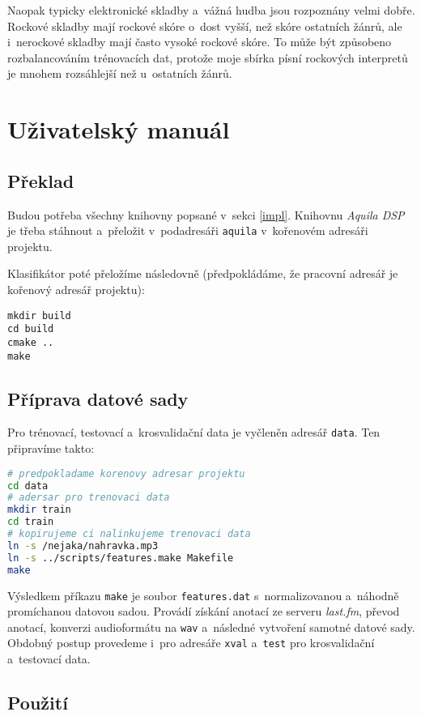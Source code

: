 \documentclass[10pt,a4paper,twocolumn]{article}
\begin{document}
Naopak typicky elektronické skladby a~vážná hudba jsou rozpoznány velmi dobře.
Rockové skladby mají rockové skóre o~dost vyšší, než skóre ostatních žánrů,
ale i~nerockové skladby mají často vysoké rockové skóre.
To může být způsobeno rozbalancováním trénovacích dat,
protože moje sbírka písní rockových interpretů je mnohem rozsáhlejší
než u~ostatních žánrů.

\section{Uživatelský manuál}

\subsection{Překlad}

Budou potřeba všechny knihovny popsané v~sekci \ref{impl}. Knihovnu \emph{Aquila DSP}
je třeba stáhnout a~přeložit v~pod\-adresáři \verb|aquila| v~kořenovém adresáři projektu.

Klasifikátor poté přeložíme následovně (předpokládáme, že pracovní adresář je kořenový adresář projektu):

\begin{lstlisting}
mkdir build
cd build
cmake ..
make
\end{lstlisting}

\subsection{Příprava datové sady}

Pro trénovací, testovací a~krosvalidační data je vyčleněn adresář \verb|data|.
Ten připravíme takto:

\begin{lstlisting}[language=sh]
# predpokladame korenovy adresar projektu
cd data
# adersar pro trenovaci data
mkdir train
cd train
# kopirujeme ci nalinkujeme trenovaci data
ln -s /nejaka/nahravka.mp3
ln -s ../scripts/features.make Makefile
make
\end{lstlisting}

Výsledkem příkazu \verb|make| je soubor \verb|features.dat|
s~normalizovanou a~náhodně promíchanou datovou sadou.
Provádí získání anotací ze serveru \emph{last.fm},
převod anotací, konverzi audioformátu na \verb|wav|
a~následné vytvoření samotné datové sady.
Obdobný postup provedeme i~pro adresáře \verb|xval| a~\verb|test|
pro krosvalidační a~testovací data.

\subsection{Použití}
\end{document}
